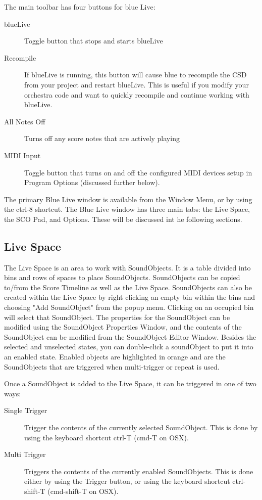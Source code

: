The main toolbar has four buttons for blue Live:

\begin{description}
\item[blueLive]
Toggle button that stops and starts blueLive
\item[Recompile]
If blueLive is running, this button will cause blue to recompile the CSD
from your project and restart blueLive. This is useful if you modify
your orchestra code and want to quickly recompile and continue working
with blueLive.
\item[All Notes Off]
Turns off any score notes that are actively playing
\item[MIDI Input]
Toggle button that turns on and off the configured MIDI devices setup in
Program Options (discussed further below).
\end{description}

The primary Blue Live window is available from the Window Menu, or by
using the ctrl-8 shortcut. The Blue Live window has three main tabs: the
Live Space, the SCO Pad, and Options. These will be discussed int he
following sections.

\subsection{Live Space}

The Live Space is an area to work with SoundObjects. It is a table
divided into bins and rows of spaces to place SoundObjects. SoundObjects
can be copied to/from the Score Timeline as well as the Live Space.
SoundObjects can also be created within the Live Space by right clicking
an empty bin within the bins and choosing "Add SoundObject" from the
popup menu. Clicking on an occupied bin will select that SoundObject.
The properties for the SoundObject can be modified using the SoundObject
Properties Window, and the contents of the SoundObject can be modified
from the SoundObject Editor Window. Besides the selected and unselected
states, you can double-click a soundObject to put it into an enabled
state. Enabled objects are highlighted in orange and are the
SoundObjects that are triggered when multi-trigger or repeat is used.

Once a SoundObject is added to the Live Space, it can be triggered in
one of two ways:

\begin{description}
\item[Single Trigger]
Trigger the contents of the currently selected SoundObject. This is done
by using the keyboard shortcut ctrl-T (cmd-T on OSX).
\item[Multi Trigger]
Triggers the contents of the currently enabled SoundObjects. This is
done either by using the Trigger button, or using the keyboard shortcut
ctrl-shift-T (cmd-shift-T on OSX).
\end{description}


